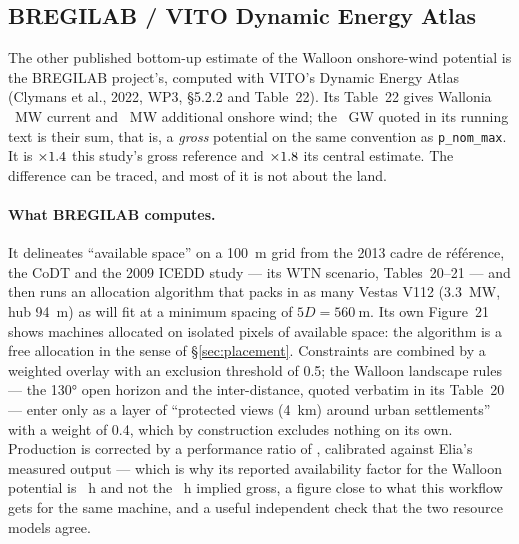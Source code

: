 \documentclass[11pt,a4paper]{article}
\begin{document}
\subsection{BREGILAB / VITO Dynamic Energy Atlas}\label{sec:bregilab}

The other published bottom-up estimate of the Walloon onshore-wind potential is
the BREGILAB project's, computed with VITO's Dynamic Energy Atlas (Clymans et
al., 2022, WP3, §5.2.2 and Table~22). Its Table~22 gives Wallonia
\BregCurrent{}~MW current and \BregAdditional{}~MW additional onshore wind; the
\BregTotalGW{}~GW quoted in its running text is their sum, that is, a
\emph{gross} potential on the same convention as \texttt{p\_nom\_max}. It is
$\times1.4$ this study's gross reference and
$\times1.8$ its central estimate. The difference can be traced, and
most of it is not about the land.

\paragraph{What BREGILAB computes.} It delineates ``available space'' on a
\SI{100}{\metre} grid from the 2013 cadre de référence, the CoDT and the 2009
ICEDD study --- its WTN scenario, Tables~20--21 --- and then runs an allocation
algorithm that packs in as many Vestas V112 (3.3~MW, hub \SI{94}{\metre}) as
will fit at a minimum spacing of $5D = \SI{560}{\metre}$. Its own Figure~21
shows machines allocated on isolated pixels of available space: the algorithm is
a free allocation in the sense of §\ref{sec:placement}. Constraints are combined
by a weighted overlay with an exclusion threshold of 0.5; the Walloon landscape
rules --- the 130° open horizon and the inter-distance, quoted verbatim in its
Table~20 --- enter only as a layer of ``protected views (4~km) around urban
settlements'' with a weight of 0.4, which by construction excludes nothing on its
own. Production is corrected by a performance ratio of \BregPerf{}, calibrated
against Elia's measured output --- which is why its reported availability factor
for the Walloon potential is \BregFlh{}~h and not the \BregFlhGross{}~h implied
gross, a figure close to what this workflow gets for the same machine, and a
useful independent check that the two resource models agree.
\end{document}
